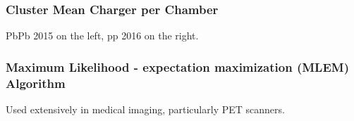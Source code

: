 \documentclass{beamer}
\begin{document}
\begin{frame}
  \frametitle{Cluster Mean Charger per Chamber}

PbPb 2015 on the left, pp 2016 on the right.
\end{frame}

\begin{frame}
  \frametitle{Maximum Likelihood - expectation maximization (MLEM) Algorithm} 
  Used extensively in medical imaging, particularly PET scanners.
\end{frame}
\end{document}

